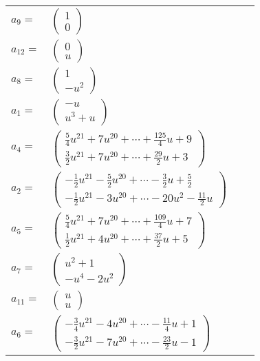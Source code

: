 \documentclass[1p]{elsarticle_modified}
\theoremstyle{definition}
\begin{document}
\begin{tabular}{m{7pt} m{180pt} m{7pt} m{180pt} }
\flushright $a_{9}=$&$\begin{pmatrix}1\\0\end{pmatrix}$ \\
\flushright $a_{12}=$&$\begin{pmatrix}0\\u\end{pmatrix}$ \\
\flushright $a_{8}=$&$\begin{pmatrix}1\\- u^2\end{pmatrix}$ \\
\flushright $a_{1}=$&$\begin{pmatrix}- u\\u^3+u\end{pmatrix}$ \\
\flushright $a_{4}=$&$\begin{pmatrix}\frac{5}{4} u^{21}+7 u^{20}+\cdots+\frac{125}{4} u+9\\\frac{3}{2} u^{21}+7 u^{20}+\cdots+\frac{29}{2} u+3\end{pmatrix}$ \\
\flushright $a_{2}=$&$\begin{pmatrix}-\frac{1}{2} u^{21}-\frac{5}{2} u^{20}+\cdots-\frac{3}{2} u+\frac{5}{2}\\-\frac{1}{2} u^{21}-3 u^{20}+\cdots-20 u^2-\frac{11}{2} u\end{pmatrix}$ \\
\flushright $a_{5}=$&$\begin{pmatrix}\frac{5}{4} u^{21}+7 u^{20}+\cdots+\frac{109}{4} u+7\\\frac{1}{2} u^{21}+4 u^{20}+\cdots+\frac{37}{2} u+5\end{pmatrix}$ \\
\flushright $a_{7}=$&$\begin{pmatrix}u^2+1\\- u^4-2 u^2\end{pmatrix}$ \\
\flushright $a_{11}=$&$\begin{pmatrix}u\\u\end{pmatrix}$ \\
\flushright $a_{6}=$&$\begin{pmatrix}-\frac{3}{4} u^{21}-4 u^{20}+\cdots-\frac{11}{4} u+1\\-\frac{3}{2} u^{21}-7 u^{20}+\cdots-\frac{23}{2} u-1\end{pmatrix}$ \\

\end{tabular}
\end{document}
